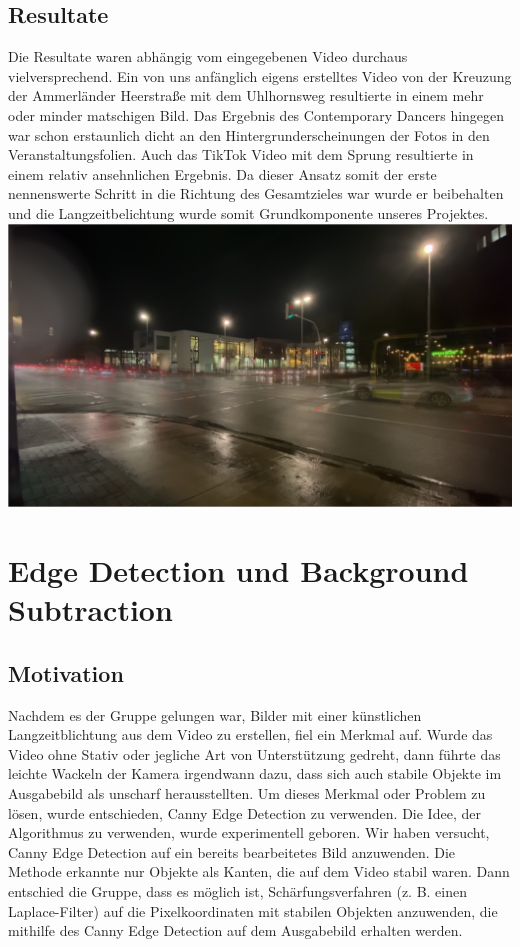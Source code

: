 \documentclass[12pt]{scrartcl}
\begin{document}
 \subsection{Resultate}Die Resultate waren abh\"angig vom eingegebenen Video durchaus vielversprechend. Ein von uns anf\"anglich eigens erstelltes Video von der Kreuzung der Ammerl\"ander Heerstra{\ss}e mit dem Uhlhornsweg resultierte in einem mehr oder minder matschigen Bild. Das Ergebnis des Contemporary Dancers hingegen war schon erstaunlich dicht an den Hintergrunderscheinungen der Fotos in den Veranstaltungsfolien. Auch das TikTok Video mit dem Sprung resultierte in einem relativ ansehnlichen Ergebnis. Da dieser Ansatz somit der erste nennenswerte Schritt in die Richtung des Gesamtzieles war wurde er beibehalten und die Langzeitbelichtung wurde somit Grundkomponente unseres Projektes.\\
 \includegraphics[width=\textwidth]{media/artlzb}


\section{Edge Detection und Background Subtraction}
\subsection{Motivation}
Nachdem es der Gruppe gelungen war, Bilder mit einer k\"unstlichen Langzeitblichtung aus dem Video zu erstellen, fiel ein Merkmal auf. Wurde das Video ohne Stativ oder jegliche Art von Unterst\"utzung gedreht, dann führte das leichte Wackeln der Kamera irgendwann dazu, dass sich auch stabile Objekte im Ausgabebild als unscharf herausstellten. Um dieses Merkmal oder Problem zu l\"osen, wurde entschieden, Canny Edge Detection zu verwenden.
Die Idee, der Algorithmus zu verwenden, wurde experimentell geboren. Wir haben versucht, Canny Edge Detection auf ein bereits bearbeitetes Bild anzuwenden. Die Methode erkannte nur Objekte als Kanten, die auf dem Video stabil waren. Dann entschied die Gruppe, dass es m\"oglich ist, Sch\"arfungsverfahren (z. B. einen Laplace-Filter) auf die Pixelkoordinaten mit stabilen Objekten anzuwenden, die mithilfe des Canny Edge Detection auf dem Ausgabebild erhalten werden.
\end{document}
